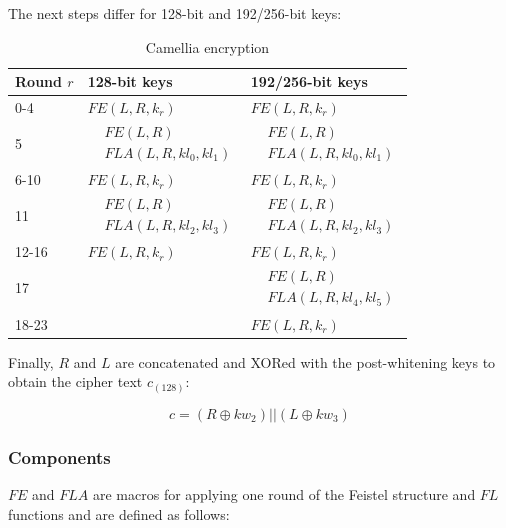 The next steps differ for 128-bit and 192/256-bit keys:

\begin{table}[h!]
    \centering
    \caption{Camellia encryption}
    \begin{tabular}{lll}
        \toprule
        Round $r$ & 128-bit keys & 192/256-bit keys \\
        \midrule
        0-4 & $FE(L,R,k_r)$ & $FE(L,R,k_r)$ \\
        \midrule
        5 & {$\!\begin{aligned}&FE(L,R)\\&FLA(L,R,kl_0,kl_1)\end{aligned}$} & {$\!\begin{aligned}&FE(L,R)\\&FLA(L,R,kl_0,kl_1)\end{aligned}$} \\
        \midrule
        6-10 & $FE(L,R,k_r)$ & $FE(L,R,k_r)$ \\
        \midrule
        11 & {$\!\begin{aligned}&FE(L,R)\\&FLA(L,R,kl_2,kl_3)\end{aligned}$} & {$\!\begin{aligned}&FE(L,R)\\&FLA(L,R,kl_2,kl_3)\end{aligned}$} \\
        \midrule
        12-16 & $FE(L,R,k_r)$ & $FE(L,R,k_r)$ \\
        \midrule
        17 & & {$\!\begin{aligned}&FE(L,R)\\&FLA(L,R,kl_4,kl_5)\end{aligned}$} \\
        \midrule
        18-23 & & $FE(L,R,k_r)$ \\
        \bottomrule
    \end{tabular}
\end{table}

Finally, $R$ and $L$ are concatenated and XORed with the post-whitening keys to
obtain the cipher text $c_{(128)}$:

\[
    c=(R\oplus kw_2)||(L\oplus kw_3)
\]

\subsubsection{Components}

$FE$ and $FLA$ are macros for applying one round of the Feistel structure and
$FL$ functions and are defined as follows:



